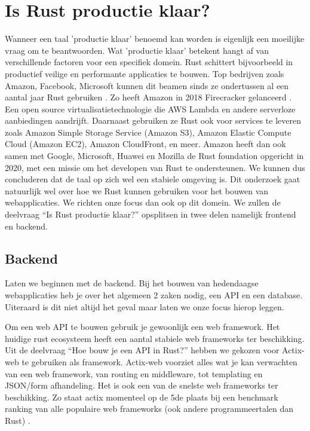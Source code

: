 \clearpage

\section{Is Rust productie klaar?}
\label{productie}

Wanneer een taal 'productie klaar' benoemd kan worden is eigenlijk een moeilijke vraag om te
beantwoorden. Wat 'productie klaar' betekent hangt af van verschillende factoren voor een specifiek
domein. Rust schittert bijvoorbeeld in productief veilige en performante applicaties te bouwen. Top
bedrijven zoals Amazon, Facebook, Microsoft kunnen dit beamen sinds ze ondertussen al een aantal jaar
Rust gebruiken \cite{rust_companies}. Zo heeft Amazon in 2018 Firecracker gelanceerd
\cite{aws_sustainability}. Een open source virtualisatietechnologie die AWS Lambda en andere
serverloze aanbiedingen aandrijft. Daarnaast gebruiken ze Rust ook voor services te leveren zoals
Amazon Simple Storage Service (Amazon S3), Amazon Elastic Compute Cloud (Amazon EC2), Amazon
CloudFront, en meer. Amazon heeft dan ook samen met Google, Microsoft, Huawei en Mozilla de Rust
foundation opgericht in 2020, met een missie om het developen van Rust te ondersteunen. We kunnen
dus concluderen dat de taal op zich wel een stabiele omgeving is. Dit onderzoek gaat natuurlijk wel
over hoe we Rust kunnen gebruiken voor het bouwen van webapplicaties. We richten onze focus dan ook
op dit domein. We zullen de deelvraag “Is Rust productie klaar?” opsplitsen in twee delen namelijk
frontend en backend. 

\subsection{Backend }

Laten we beginnen met de backend. Bij het bouwen van hedendaagse webapplicaties heb je over het
algemeen 2 zaken nodig, een API en een database. Uiteraard is dit niet altijd het geval maar laten
we onze focus hierop leggen. 

Om een web API te bouwen gebruik je gewoonlijk een web framework. Het huidige rust ecosysteem heeft
een aantal stabiele web frameworks ter beschikking. Uit de deelvraag “Hoe bouw je een API in
Rust?” hebben we gekozen voor Actix-web te gebruiken als framework. Actix-web voorziet alles wat je
kan verwachten van een web framework, van routing en middleware, tot templating en JSON/form
afhandeling. Het is ook een van de snelste web frameworks ter beschikking. Zo staat actix momenteel
op de 5de plaats bij een benchmark ranking van alle populaire web frameworks (ook andere
programmeertalen dan Rust) \cite{web_bench}. 

